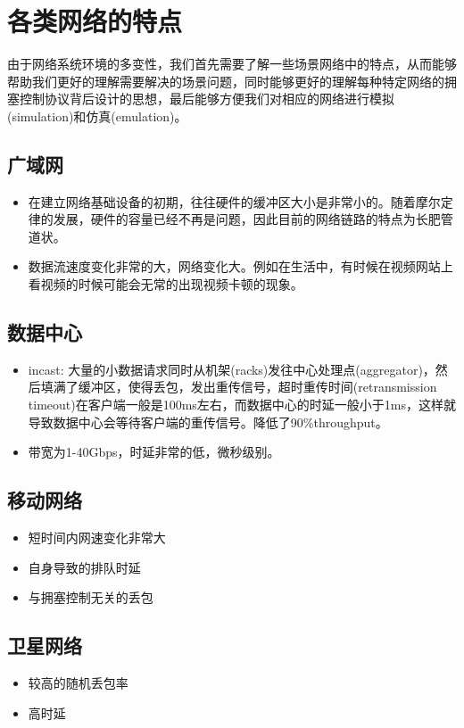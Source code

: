 \documentclass[a4paper, 12pt, UTF8]{ctexart}
\begin{document}
\clearpage

\section{各类网络的特点}
\par 由于网络系统环境的多变性，我们首先需要了解一些场景网络中的特点，从而能够帮助我们更好的理解需要解决的场景问题，同时能够更好的理解每种特定网络的拥塞控制协议背后设计的思想，最后能够方便我们对相应的网络进行模拟(simulation)和仿真(emulation)。

\subsection{广域网}
\begin{itemize}
	\item 在建立网络基础设备的初期，往往硬件的缓冲区大小是非常小的。随着摩尔定律的发展，硬件的容量已经不再是问题，因此目前的网络链路的特点为长肥管道状。
	\item 数据流速度变化非常的大，网络变化大。例如在生活中，有时候在视频网站上看视频的时候可能会无常的出现视频卡顿的现象。
\end{itemize}

\subsection{数据中心}

\begin{itemize}
	\item incast: 大量的小数据请求同时从机架(racks)发往中心处理点(aggregator)，然后填满了缓冲区，使得丢包，发出重传信号，超时重传时间(retransmission timeout)在客户端一般是100ms左右，而数据中心的时延一般小于1ms，这样就导致数据中心会等待客户端的重传信号。降低了90\%throughput。
	\item 带宽为1-40Gbps，时延非常的低，微秒级别。
\end{itemize}

\subsection{移动网络}

\begin{itemize}
	\item 短时间内网速变化非常大
	\item 自身导致的排队时延
	\item 与拥塞控制无关的丢包
\end{itemize}

\subsection{卫星网络}
\begin{itemize}
	\item 较高的随机丢包率
	\item 高时延
\end{itemize}
\end{document}
